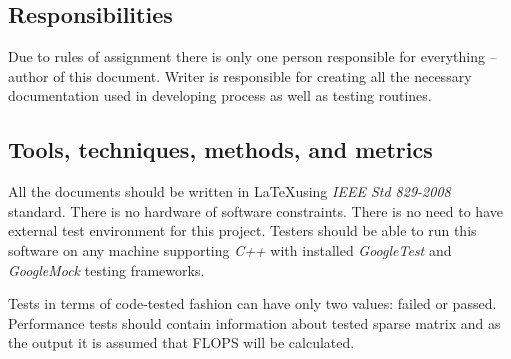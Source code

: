 \subsection{Responsibilities} \label{s:introduction:resposibilities}
	\begin{comment}
		$<$Provide an overview of the organizational content topic(s) and responsibilities for testing tasks. Identify organizational components and their primary (they are the task leader) and secondary (they are not the leader, but providing support) test-related responsibilities. $>$
	\end{comment}
	Due to rules of assignment there is only one person responsible for everything -- author of this document. Writer is responsible for creating all the necessary documentation used in developing process as well as testing routines.
\subsection{Tools, techniques, methods, and metrics} \label{s:introduction:tools-techniques-methods-and-metrics}
	\begin{comment}
		$<$Describe documents, hardware and software, test tools, techniques, methods, and test environment to be used in the test process. Describe the techniques that will be used to identify and capture reusable testware. Include information regarding acquisition, training, support, and qualification for each tool, technology, and method.\\
		Document the metrics to be used by the test effort, and describe how these metrics support the test objectives. Metrics appropriate to the Level Test Plans (e.g., component, component integration, system, and acceptance) may be included in those documents (see Annex E). $>$
	\end{comment}
	All the documents should be written in \LaTeX using \emph{IEEE Std 829-2008} standard. There is no hardware of software constraints. There is no need to have external test environment for this project. Testers should be able to run this software on any machine supporting \emph{C++} with installed \emph{GoogleTest} and \emph{GoogleMock} testing frameworks.
	
	Tests in terms of code-tested fashion can have only two values: failed or passed. Performance tests should contain information about tested sparse matrix and as the output it is assumed that \gls{FLOPS} will be calculated.
	
	\begin{center}
	\end{center}